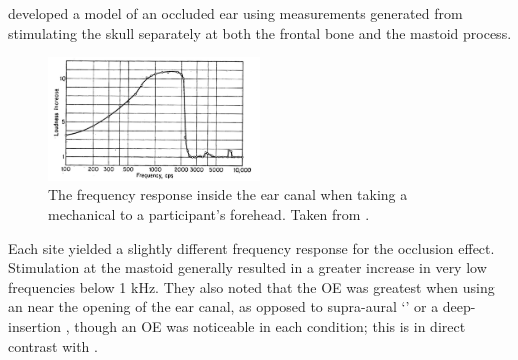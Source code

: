 \cite{stenfelt:07} developed a model of an occluded ear using measurements generated from stimulating the skull separately at both the frontal bone and the mastoid process.
%
\begin{figure}
\includegraphics[width=0.5\textwidth]{figure/bekesy60-1.png}
\caption{The frequency response inside the ear canal when taking a mechanical \DIFdelbegin {}\DIFdelend \DIFaddbegin {}\DIFaddend to a participant's forehead.  Taken from \cite{bekesy:60}.}
\label{fig:bekesyOEresponse}
\end{figure}
%
Each site yielded a slightly different frequency response for the occlusion effect.  Stimulation at the mastoid generally resulted in a greater increase in very low frequencies below 1 kHz.  They also noted that the OE was greatest when using an \DIFdelbegin {}\DIFdelend \DIFaddbegin {}\DIFaddend near the opening of the ear canal, as opposed to supra-aural `\DIFdelbegin {}\DIFdelend \DIFaddbegin {}\DIFaddend ' or a deep-insertion \DIFdelbegin {}\DIFdelend \DIFaddbegin {}\DIFaddend , though an OE was noticeable in each condition; this is in direct contrast with \cite{dean:00}.  %
\DIFdelbegin %
{%
}
